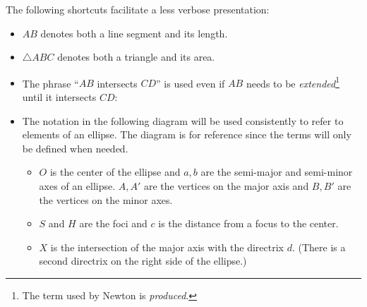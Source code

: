 The following shortcuts facilitate a less verbose presentation:
\begin{itemize}

\item $AB$ denotes both a line segment and its length.
\item $\triangle ABC$ denotes both a triangle and its area.
\item The phrase ``$AB$ intersects $CD$'' is used even if $AB$ needs to be \emph{extended}\footnote{The term used by Newton is \emph{produced}.} until it intersects $CD$:
\begin{center}
\end{center}
\item The notation in the following diagram will be used consistently to refer to elements of an ellipse. The diagram is for reference since the terms will only be defined when needed.
\begin{itemize}
\item $O$ is the center of the ellipse and $a,b$ are the semi-major and semi-minor axes of an ellipse. $A,A'$ are the vertices on the major axis and $B,B'$ are the vertices on the minor axes.
\item $S$ and $H$ are the foci and $c$ is the distance from a focus to the center.
\item $X$ is the intersection of the major axis with the directrix $d$. (There is a second directrix on the right side of the ellipse.)
\end{itemize}
\end{itemize}


